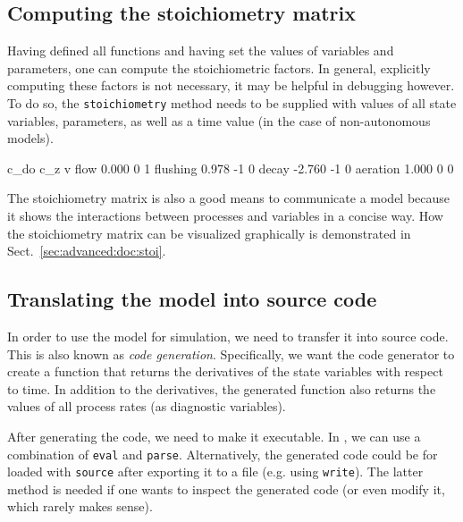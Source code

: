\documentclass[times,onecolumn]{article}
\begin{document}
\subsection{Computing the stoichiometry matrix}

Having defined all functions and having set the values of variables and parameters, one can compute the stoichiometric factors. In general, explicitly computing these factors is not necessary, it may be helpful in debugging however. To do so, the \verb|stoichiometry| method needs to be supplied with values of all state variables, parameters, as well as a time value (in the case of non-autonomous models).

\begin{Schunk}
\begin{Soutput}
           c_do c_z v
flow      0.000   0 1
flushing  0.978  -1 0
decay    -2.760  -1 0
aeration  1.000   0 0
\end{Soutput}
\end{Schunk}

The stoichiometry matrix is also a good means to communicate a model because it shows the interactions between processes and variables in a concise way. How the stoichiometry matrix can be visualized graphically is demonstrated in Sect.~\ref{sec:advanced:doc:stoi}.

\subsection{Translating the model into source code}

In order to use the model for simulation, we need to transfer it into source code. This is also known as \emph{code generation}. Specifically, we want the code generator to create a function that returns the derivatives of the state variables with respect to time. In addition to the derivatives, the generated function also returns the values of all process rates (as diagnostic variables).

After generating the code, we need to make it executable. In , we can use a combination of \verb|eval| and \verb|parse|. Alternatively, the generated code could be for loaded with \verb|source| after exporting it to a file (e.g. using \verb|write|). The latter method is needed if one wants to inspect the generated code (or even modify it, which rarely makes sense).
\end{document}

